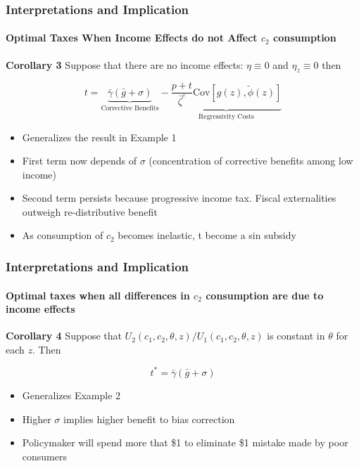 \documentclass{beamer}
\newcommand{\Cov}{\mathrm{Cov}}
\begin{document}
\begin{frame}
\frametitle{Interpretations and Implication}
\framesubtitle{ Optimal Taxes When Income Effects do not Affect $c_2$ consumption}

\textbf{Corollary 3} Suppose that there are no income effects: $\eta \equiv 0$ and $\eta_z \equiv 0 $ then 

$$ t = \underbrace{\bar{\gamma}(\bar{g} + \sigma)}_\text{Corrective Benefits} -  \underbrace{\frac{p + t}{\bar{\zeta}^c} \Cov \left[ g(z), \tilde{\phi}(z)  \right]}_\text{Regressivity Costs} $$

\begin{itemize}
	\item Generalizes the result in Example 1
	\item First term now depends of $\sigma$ (concentration of corrective benefits among low income)
	\item Second term persists because progressive income tax. Fiscal externalities outweigh re-distributive benefit 
	\item As consumption of $c_2$ becomes inelastic, t become a sin subsidy
\end{itemize}
\end{frame}






\begin{frame}
\frametitle{Interpretations and Implication}
\framesubtitle{Optimal taxes when all differences in $c_2$ consumption are due to income effects }

\textbf{Corollary 4} Suppose that $U_2(c_1,c_2, \theta, z) / U_1(c_1,c_2, \theta, z)$ is constant in $\theta$ for each $z$. Then 

$$ t^* = \bar{\gamma}(\bar{g} + \sigma)$$

\begin{itemize}
	\item Generalizes Example 2 
	\item Higher $\sigma$ implies higher benefit to bias correction
	\item Policymaker will spend more that \$1 to eliminate \$1 mistake made by poor consumers
\end{itemize}
\end{frame}
\end{document}
